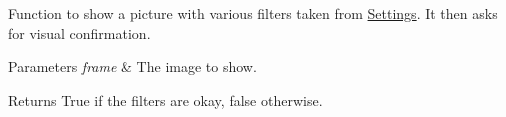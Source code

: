 Function to show a picture with various filters taken from \mbox{\hyperlink{class_settings}{Settings}}. It then asks for visual confirmation.


\begin{DoxyParams}{Parameters}
{\em frame} & The image to show. \\
\hline
\end{DoxyParams}
\begin{DoxyReturn}{Returns}
True if the filters are okay, false otherwise. 
\end{DoxyReturn}
